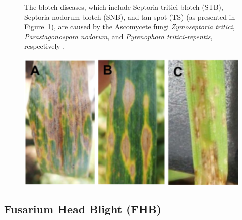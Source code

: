 \begin{figure}[H]
    \centering
    \begin{minipage}{0.55\textwidth}
        \small
        The blotch diseases, which include Septoria tritici blotch (STB), Septoria nodorum blotch (SNB), and tan spot (TS) (as presented in Figure~\ref{fig:Figure06}), are caused by the Ascomycete fungi \textit{Zymoseptoria tritici}, \textit{Parastagonospora nodorum}, and \textit{Pyrenophora tritici-repentis}, respectively \parencite{figueroa2018review}.
    \end{minipage}%
    \hfill
    \begin{minipage}{0.4\textwidth}
        \centering
        \includegraphics[width=0.9\linewidth]{chapters/chapter2/images/Figure06.png}
        \label{fig:Figure06}
    \end{minipage}
\end{figure}

\subsection{Fusarium Head Blight (FHB)}

